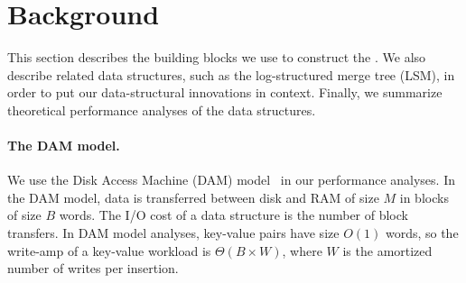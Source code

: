\section{Background}
\label{sec:background}          

This section describes the building blocks we use to construct the
\datastruct.  We also describe related data structures, such as the
log-structured merge tree (LSM), in order to put our data-structural
innovations in context.  Finally, we summarize theoretical performance
analyses of the data structures.







\paragraph{The DAM model.}
We use the Disk Access Machine (DAM) model~\cite{!aggarwal:vitter:input:output:complexity:sorting} 
in our performance analyses.  In the DAM model, data is transferred between disk and
RAM of size $M$ in blocks of size $B$ words.  The I/O cost of a data
structure is the number of block transfers.
%
In DAM model analyses, key-value pairs have size $O(1)$ words, so  the
write-amp 
of a key-value workload is
$\Theta(B\times W)$,
where $W$ is the amortized number of writes per insertion.

